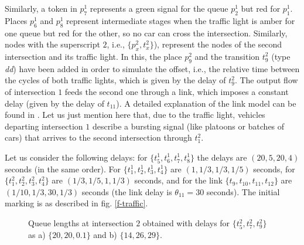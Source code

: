 Similarly, a
token in $p_7^1$ represents a green signal for the queue $p_2^1$ but
red for $p_1^1$. Places $p_6^1$ and $p_8^1$ represent intermediate
stages when the traffic light is amber for one queue but red for
the other, so no car can cross the intersection. Similarly, nodes
with the superscript $2$, i.e., $\{p^2_x,t^2_x\}$), represent the
nodes of the second intersection and its traffic light. In this, the
place $p_9^2$ and the transition $t_9^2$ (type \emph{dd}) have been added
in order to simulate the offset, i.e., the relative time between the
cycles of both traffic lights, which is given by the delay of
$t_9^2$. The output flow of intersection $1$ feeds the second one
through a link, which imposes a constant delay (given by the delay
of $t_{11}$). A detailed explanation of the link model can be found
in \cite{IPVaSuBoSi10}. Let us just mention here that, due to the
traffic light, vehicles departing intersection $1$ describe a
bursting signal (like platoons or batches of cars) that arrives to
the second intersection through $t_1^2$.


Let us consider the following delays: for
$\{t_5^1,t_6^1,t_7^1,t_8^1\}$ the delays are $(20,5,20,4)$ seconds
(in the same order). For $\{t_1^1,t_2^1,t_3^1,t_4^1\}$ are
$(1,1/3,1/3,1/5)$ seconds, for $\{t_1^2,t_2^2,t_3^2,t_4^2\}$ are
$(1/3,1/5,1,1/3)$ seconds, and for the link
$\{t_9,t_{10},t_{11},t_{12}\}$ are $(1/10,1/3,30,1/3)$ seconds (the
link delay is $\theta_{11}=30$ seconds). The initial marking is as
described in fig. \ref{f-traffic}.


\begin{figure}
\centering {}
\hspace{0.5cm} 
\caption{Queue lengths at intersection $2$ obtained with delays for
$\{t_5^2,t_7^2,t_9^2\}$ as  a) $\{20,20,0.1\}$ and b)
$\{14,26,29\}$. } \label{ftraficsim}
\end{figure}

